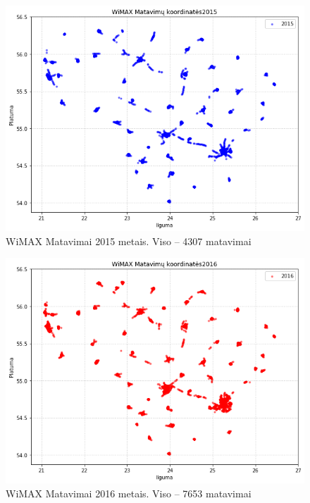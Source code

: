 \documentclass{VUMIFPSbakalaurinis}
\begin{document}
\begin{figure}[H]
	\centering
	\includegraphics[scale=0.33]{img/WiMAX-1}
	\caption{WiMAX Matavimai 2015 metais. Viso – 4307 matavimai}
	\label{img:WiMAX-1}
\end{figure}
\begin{figure}[H]
	\centering
	\includegraphics[scale=0.33]{img/WiMAX-2}
	\caption{WiMAX Matavimai 2016 metais. Viso – 7653 matavimai}
	\label{img:WiMAX-2}
\end{figure}
\end{document}
